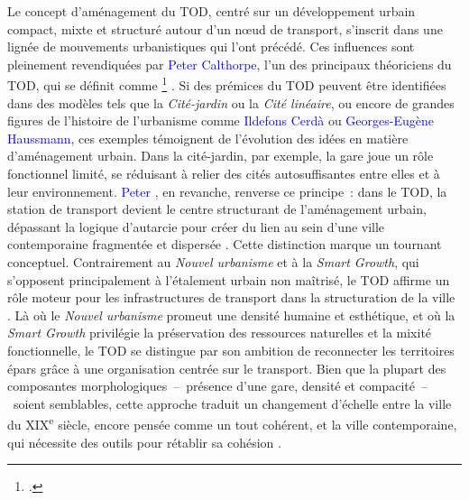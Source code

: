 \begin{refsegment}
Le concept d’aménagement du \acrshort{TOD}, centré sur un développement urbain compact, mixte et structuré autour d’un nœud de transport, s’inscrit dans une lignée de mouvements urbanistiques qui l’ont précédé. Ces influences sont pleinement revendiquées par \textcolor{blue}{Peter Calthorpe}, l’un des principaux théoriciens du \acrshort{TOD}, qui se définit comme \footnote{
     \textcolor{blue}{\autocite[5]{newman_focus_1991}}.
} \textcolor{blue}{\autocite[5]{newman_focus_1991}}. Si des prémices du \acrshort{TOD} peuvent être identifiées dans des modèles tels que la \textsl{Cité-jardin} ou la \textsl{Cité linéaire}, ou encore de grandes figures de l'histoire de l'urbanisme comme \textcolor{blue}{Ildefons Cerdà} ou \textcolor{blue}{Georges-Eugène Haussmann}, ces exemples témoignent de l’évolution des idées en matière d’aménagement urbain. Dans la cité-jardin, par exemple, la gare joue un rôle fonctionnel limité, se réduisant à relier des cités autosuffisantes entre elles et à leur environnement. \textcolor{blue}{Peter} \textcolor{blue}{\textcite[43-49]{calthorpe_next_1993}}, en revanche, renverse ce principe~: dans le \acrshort{TOD}, la station de transport devient le centre structurant de l’aménagement urbain, dépassant la logique d’autarcie pour créer du lien au sein d’une ville contemporaine fragmentée et dispersée \textcolor{blue}{\autocite[51]{el_hadeuf_ville_2017}}. Cette distinction marque un tournant conceptuel. Contrairement au \textsl{Nouvel urbanisme} et à la \textsl{Smart Growth}, qui s’opposent principalement à l’étalement urbain non maîtrisé, le \acrshort{TOD} affirme un rôle moteur pour les infrastructures de transport dans la structuration de la ville \textcolor{blue}{\autocite[51]{el_hadeuf_ville_2017}}. Là où le \textsl{Nouvel urbanisme} promeut une densité humaine et esthétique, et où la \textsl{Smart Growth} privilégie la préservation des ressources naturelles et la mixité fonctionnelle, le \acrshort{TOD} se distingue par son ambition de reconnecter les territoires épars grâce à une organisation centrée sur le transport. Bien que la plupart des composantes morphologiques~–~présence d'une gare, densité et compacité~–~soient semblables, cette approche traduit un changement d’échelle entre la ville du XIX\textsuperscript{e} siècle, encore pensée comme un tout cohérent, et la ville contemporaine, qui nécessite des outils pour rétablir sa cohésion \textcolor{blue}{\autocite[37]{leysens_reconfiguration_2011}}.%


\end{refsegment}
